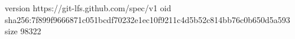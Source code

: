 version https://git-lfs.github.com/spec/v1
oid sha256:7f899f9666871c051bcdf70232e1ec10f9211c4d5b52c814bb76c0b650d5a593
size 98322
